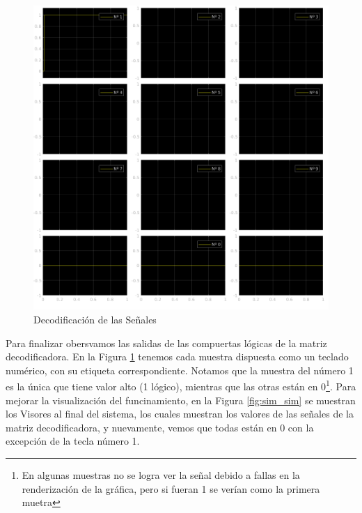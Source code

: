 \begin{figure}[!htb]
  \centering
  \includegraphics[width=\linewidth]{images/simulacion/extendido/decod.png}
  \caption{Decodificación de las Señales}
  \label{fig:sim_decod}
\end{figure}

Para finalizar obersvamos las salidas de las compuertas lógicas de la matriz decodificadora. En la Figura \ref{fig:sim_decod} tenemos cada muestra dispuesta como un teclado numérico, con su etiqueta correspondiente. Notamos que la muestra del número 1 es la única que tiene valor alto (1 lógico), mientras que las otras están en 0\footnote{En algunas muestras no se logra ver la señal debido a fallas en la renderización de la gráfica, pero si fueran 1 se verían como la primera muetra}. Para mejorar la visualización del funcinamiento, en la Figura \ref{fig:sim_sim} se muestran los Visores al final del sistema, los cuales muestran los valores de las señales de la matriz decodificadora, y nuevamente, vemos que todas están en 0 con la excepción de la tecla número 1.

